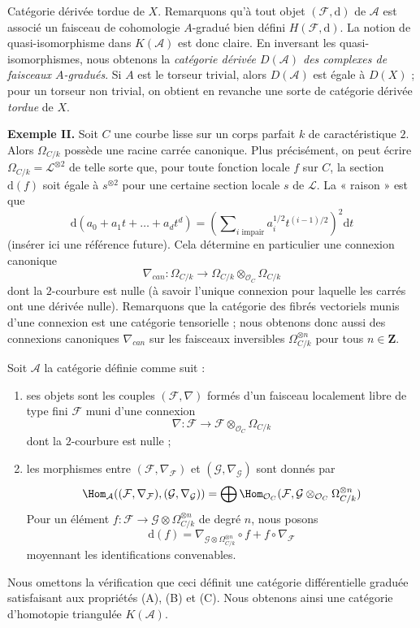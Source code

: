\medskip\noindent
Catégorie dérivée tordue de $X$. Remarquons qu'à tout objet
$(\mathcal{F}, \text{d})$ de $\mathcal{A}$ est associé un faisceau de
cohomologie $A$-gradué bien défini $H(\mathcal{F}, \text{d})$.
La notion de quasi-isomorphisme dans $K(\mathcal{A})$ est donc claire.
En inversant les quasi-isomorphismes, nous obtenons la
{\it catégorie dérivée $D(\mathcal{A})$ des complexes de faisceaux
$A$-gradués}. Si $A$ est le torseur trivial, alors $D(\mathcal{A})$
est égale à $D(X)$ ; pour un torseur non trivial, on obtient en revanche
une sorte de catégorie dérivée {\it tordue} de $X$.

\medskip\noindent
{\bf Exemple II.} Soit $C$ une courbe lisse sur un corps parfait $k$ de
caractéristique $2$. Alors $\Omega_{C/k}$ possède une racine carrée canonique.
Plus précisément, on peut écrire $\Omega_{C/k} = \mathcal{L}^{\otimes 2}$
de telle sorte que, pour toute fonction locale $f$ sur $C$, la section
$\text{d}(f)$ soit égale à $s^{\otimes 2}$ pour une certaine section locale
$s$ de $\mathcal{L}$. La « raison » est que
$$
\text{d}(a_0 + a_1t + \ldots +a_dt^d) =
(\sum\nolimits_{i\text{ impair}} a_i^{1/2} t^{(i - 1)/2})^2\text{d}t
$$
(insérer ici une référence future). Cela détermine en particulier une
connexion canonique
$$
\nabla_{can} :
\Omega_{C/k}
\longrightarrow
\Omega_{C/k} \otimes_{\mathcal{O}_C} \Omega_{C/k}
$$
dont la $2$-courbure est nulle (à savoir l'unique connexion pour laquelle
les carrés ont une dérivée nulle).
Remarquons que la catégorie des fibrés vectoriels
munis d'une connexion est une catégorie tensorielle ; nous obtenons donc aussi
des connexions canoniques
$\nabla_{can}$ sur les faisceaux inversibles $\Omega_{C/k}^{\otimes n}$ pour tous $n \in \mathbf{Z}$.

\medskip\noindent
Soit $\mathcal{A}$ la catégorie définie comme suit :
\begin{enumerate}
\item ses objets sont les couples $(\mathcal{F}, \nabla)$ formés d'un
faisceau localement libre de type fini $\mathcal{F}$ muni d'une connexion
$$
\nabla :
\mathcal{F}
\longrightarrow
\mathcal{F} \otimes_{\mathcal{O}_C} \Omega_{C/k}
$$
dont la $2$-courbure est nulle ;
\item les morphismes entre $(\mathcal{F}, \nabla_\mathcal{F})$ et
$(\mathcal{G}, \nabla_\mathcal{G})$
sont donnés par
$$
\Hom_\mathcal{A}((\mathcal{F}, \nabla_\mathcal{F}),
(\mathcal{G}, \nabla_\mathcal{G})) =
\bigoplus \Hom_{\mathcal{O}_C}(\mathcal{F},
\mathcal{G} \otimes_{\mathcal{O}_C} \Omega_{C/k}^{\otimes n})
$$
Pour un élément
$f : \mathcal{F} \to \mathcal{G} \otimes \Omega_{C/k}^{\otimes n}$
de degré $n$, nous posons
$$
\text{d}(f) =
\nabla_{\mathcal{G} \otimes \Omega_{C/k}^{\otimes n}} \circ f +
f \circ \nabla_\mathcal{F}
$$
moyennant les identifications convenables.
\end{enumerate}
Nous omettons la vérification que ceci définit une catégorie différentielle
graduée satisfaisant aux propriétés (A), (B) et (C). Nous obtenons ainsi une
catégorie d'homotopie triangulée $K(\mathcal{A})$.


